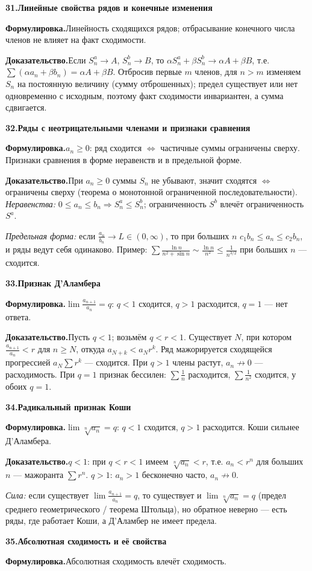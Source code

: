 \documentclass[10pt,a4paper]{article}
\renewcommand{\le}{\leqslant}
\renewcommand{\ge}{\geqslant}
\theoremstyle{definition}
\theoremstyle{plain}
\newcommand{\writespace}{\vspace{7.5mm}}
\newcommand{\prf}[2]{%
  \par\writespace\noindent
  {\large\bfseries\color{accent}#1.\enspace #2}\par\smallskip}
\newcommand{\stmt}{\par\noindent\textbf{Формулировка.}\enspace}
\newcommand{\dok}{\par\noindent\textbf{Доказательство.}\enspace}
\begin{document}
\prf{31}{Линейные свойства рядов и конечные изменения}
\stmt Линейность сходящихся рядов; отбрасывание конечного числа членов не влияет на факт
сходимости.

\dok Если $S_n^a\to A$, $S_n^b\to B$, то $\alpha S_n^a+\beta S_n^b\to\alpha A+\beta B$, т.е.
$\sum(\alpha a_n+\beta b_n)=\alpha A+\beta B$. Отбросив первые $m$ членов, для $n>m$ изменяем $S_n$
на постоянную величину (сумму отброшенных); предел существует или нет одновременно с исходным,
поэтому факт сходимости инвариантен, а сумма сдвигается.

\prf{32}{Ряды с неотрицательными членами и признаки сравнения}
\stmt $a_n\ge0$: ряд сходится $\iff$ частичные суммы ограничены сверху. Признаки сравнения в форме
неравенств и в предельной форме.

\dok При $a_n\ge0$ суммы $S_n$ не убывают, значит сходятся $\iff$ ограничены сверху (теорема о
монотонной ограниченной последовательности). \emph{Неравенства:} $0\le a_n\le b_n\Rightarrow
S_n^a\le S_n^b$; ограниченность $S^b$ влечёт ограниченность $S^a$.

\emph{Предельная форма:} если
$\tfrac{a_n}{b_n}\to L\in(0,\infty)$, то при больших $n$ $c_1 b_n\le a_n\le c_2 b_n$, и ряды ведут
себя одинаково. Пример: $\sum\tfrac{\ln n}{n^2+\sin n}\sim\tfrac{\ln n}{n^2}\le\tfrac1{n^{3/2}}$ при
больших $n$ — сходится.

\prf{33}{Признак Д'Аламбера}
\stmt $\lim\tfrac{a_{n+1}}{a_n}=q$: $q<1$ сходится, $q>1$ расходится, $q=1$ — нет ответа.

\dok Пусть $q<1$; возьмём $q<r<1$. Существует $N$, при котором $\tfrac{a_{n+1}}{a_n}<r$ для $n\ge N$,
откуда $a_{N+k}<a_N r^k$. Ряд мажорируется сходящейся прогрессией $a_N\sum r^k$ — сходится. При
$q>1$ члены растут, $a_n\not\to0$ — расходимость. При $q=1$ признак бессилен: $\sum\tfrac1n$
расходится, $\sum\tfrac1{n^2}$ сходится, у обоих $q=1$.

\prf{34}{Радикальный признак Коши}
\stmt $\lim\sqrt[n]{a_n}=q$: $q<1$ сходится, $q>1$ расходится. Коши сильнее Д'Аламбера.

\dok $q<1$: при $q<r<1$ имеем $\sqrt[n]{a_n}<r$, т.е. $a_n<r^n$ для больших $n$ — мажоранта
$\sum r^n$. $q>1$: $a_n>1$ бесконечно часто, $a_n\not\to0$.

\emph{Сила:} если существует
$\lim\tfrac{a_{n+1}}{a_n}=q$, то существует и $\lim\sqrt[n]{a_n}=q$ (предел среднего
геометрического / теорема Штольца), но обратное неверно — есть ряды, где работает Коши, а
Д'Аламбер не имеет предела.

\prf{35}{Абсолютная сходимость и её свойства}
\stmt Абсолютная сходимость влечёт сходимость.
\end{document}
